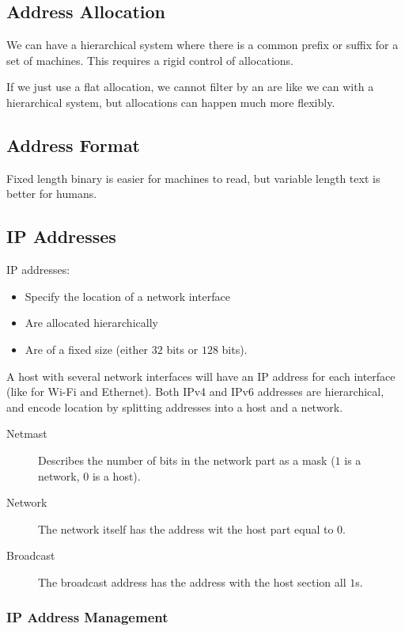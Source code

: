 \subsection{Address Allocation}\label{sub:address_allocation}

We can have a hierarchical system where there is a common prefix or suffix for a set of machines.
This requires a rigid control of allocations.

If we just use a flat allocation, we cannot filter by an are like we can with a hierarchical system, but allocations can happen much more flexibly.

\subsection{Address Format}\label{sub:address_format}

Fixed length binary is easier for machines to read, but variable length text is better for humans.

\subsection{IP Addresses}\label{sub:ip_addresses}

IP addresses:
\begin{itemize}
	\item Specify the location of a network interface
	\item Are allocated hierarchically
	\item Are of a fixed size (either \(32\) bits or \(128\) bits).
\end{itemize}
A host with several network interfaces will have an IP address for each interface (like for Wi-Fi and Ethernet).
Both IPv4 and IPv6 addresses are hierarchical, and encode location by splitting addresses into a host and a network.
\begin{description}
	\item[Netmast] Describes the number of bits in the network part as a mask (\(1\) is a network,  \(0\) is a host).
	\item[Network] The network itself has the address wit the host part equal to \(0\).
	\item[Broadcast] The broadcast address has the address with the host section all \(1\)s.
\end{description}

\subsubsection{IP Address Management}\label{ssub:ip_address_management}

